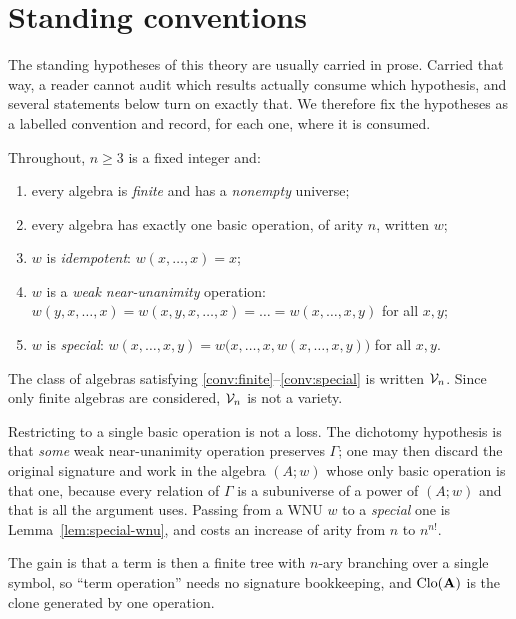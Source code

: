 \section{Standing conventions}\label{sec:conventions}

The standing hypotheses of this theory are usually carried in prose. Carried
that way, a reader cannot audit which results actually consume which
hypothesis, and several statements below turn on exactly that. We therefore fix
the hypotheses as a labelled convention and record, for each one, where it is
consumed.

\begin{convention}\label{conv:standing}
Throughout, $n\ge 3$ is a fixed integer and:
\begin{enumerate}\alphlabels\tightlist
\item\label{conv:finite} every algebra is \emph{finite} and has a
  \emph{nonempty} universe;
\item\label{conv:onebasic} every algebra has exactly one basic operation, of
  arity $n$, written $w$;
\item\label{conv:idem} $w$ is \emph{idempotent}: $w(x,\dots,x)=x$;
\item\label{conv:wnu} $w$ is a \emph{weak near-unanimity} operation:
  $w(y,x,\dots,x)=w(x,y,x,\dots,x)=\dots=w(x,\dots,x,y)$ for all $x,y$;
\item\label{conv:special} $w$ is \emph{special}:
  $w(x,\dots,x,y)=w\bigl(x,\dots,x,w(x,\dots,x,y)\bigr)$ for all $x,y$.
\end{enumerate}
The class of algebras satisfying \ref{conv:finite}--\ref{conv:special} is
written $\mathcal V_{n}$. Since only finite algebras are considered, $\mathcal V_{n}$ is not a
variety.
\end{convention}

\begin{remark}\label{rem:one-basic}
Restricting to a single basic operation is not a loss. The dichotomy hypothesis
is that \emph{some} weak near-unanimity operation preserves $\Gamma$; one may
then discard the original signature and work in the algebra
$(A;w)$ whose only basic operation is that one, because every relation of
$\Gamma$ is a subuniverse of a power of $(A;w)$ and that is all the argument
uses. Passing from a WNU $w$ to a \emph{special} one is
Lemma~\ref{lem:special-wnu}, and costs an increase of arity from $n$ to
$n^{n!}$.

The gain is that a term is then a finite tree with $n$-ary branching over a
single symbol, so ``term operation'' needs no signature bookkeeping, and
$\operatorname{Clo}(\mathbf A)$ is the clone generated by one operation.
\end{remark}

